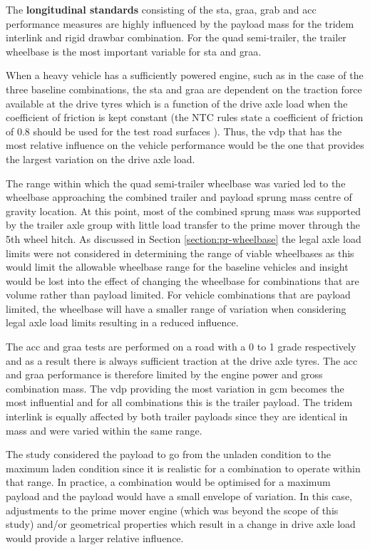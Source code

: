 The \textbf{longitudinal standards} consisting of the \gls{sta}, \gls{graa}, \gls{grab} and \gls{acc} performance measures are highly influenced by the payload mass for the tridem interlink and rigid drawbar combination. For the quad semi-trailer, the trailer wheelbase is the most important variable for \gls{sta} and \gls{graa}.

When a heavy vehicle has a sufficiently powered engine, such as in the case of the three baseline combinations, the \gls{sta} and \gls{graa} are dependent on the traction force available at the drive tyres which is a function of the drive axle load when the coefficient of friction is kept constant (the NTC rules state a coefficient of friction of 0.8 should be used for the test road surfaces \cite{NationalTransportCommission2008}). Thus, the \gls{vdp} that has the most relative influence on the vehicle performance would be the one that provides the largest variation on the drive axle load.

The range within which the quad semi-trailer wheelbase was varied led to the wheelbase approaching the combined trailer and payload sprung mass centre of gravity location. At this point, most of the combined sprung mass was supported by the trailer axle group with little load transfer to the prime mover through the 5th wheel hitch. As discussed in Section \ref{section:pr-wheelbase} the legal axle load limits were not considered in determining the range of viable wheelbases as this would limit the allowable wheelbase range for the baseline vehicles and insight would be lost into the effect of changing the wheelbase for combinations that are volume rather than payload limited. For vehicle combinations that are payload limited, the wheelbase will have a smaller range of variation when considering legal axle load limits resulting in a reduced influence.

The \gls{acc} and \gls{graa} tests are performed on a road with a 0\degree{} to 1\degree{} grade respectively and as a result there is always sufficient traction at the drive axle tyres. The \gls{acc} and \gls{graa} performance is therefore limited by the engine power and gross combination mass. The \gls{vdp} providing the most variation in \gls{gcm} becomes the most influential and for all combinations this is the trailer payload. The tridem interlink is equally affected by both trailer payloads since they are identical in mass and were varied within the same range.

The study considered the payload to go from the unladen condition to the maximum laden condition since it is realistic for a combination to operate within that range. In practice, a combination would be optimised for a maximum payload and the payload would have a small envelope of variation. In this case, adjustments to the prime mover engine (which was beyond the scope of this study) and/or geometrical properties which result in a change in drive axle load would provide a larger relative influence.

